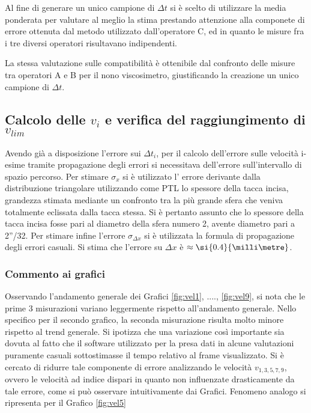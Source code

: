\documentclass[a4paper,11pt,oneside]{article}
\begin{document}
Al fine di generare un unico campione di $\Delta t$ si è scelto di utilizzare la media ponderata per valutare al meglio la stima prestando attenzione alla componete di errore ottenuta dal metodo utilizzato dall'operatore C, ed in quanto le misure fra i tre diversi operatori risultavano indipendenti.\newline

La stessa valutazione sulle compatibilità è ottenibile dal confronto delle misure tra operatori A e B per il nono viscosimetro, giustificando la creazione un unico campione di $\Delta t$.

\subsection{Calcolo delle $v_i$ e verifica del raggiungimento di $v_{lim}$}
Avendo già a disposizione l'errore sui $\Delta t_{i}$, per il calcolo dell'errore sulle velocità i-esime tramite propagazione degli errori si necessitava dell'errore sull'intervallo di spazio percorso. Per stimare $\sigma_x$ si è utilizzato l' errore derivante dalla distribuzione triangolare utilizzando come PTL lo spessore della tacca incisa, grandezza stimata mediante un confronto tra la più grande sfera che veniva totalmente eclissata dalla tacca stessa. Si è pertanto assunto che lo spessore della tacca incisa fosse pari al diametro della sfera numero 2, avente diametro pari a 2''/32. Per stimare infine l'errore $\sigma_{\Delta x}$ si è utilizzata la formula di propagazione degli errori casuali.  Si stima che l'errore su $\Delta x$ è $\approx \si{0.4}{\milli\metre}$.

\subsubsection*{Commento ai grafici}
Osservando l'andamento generale dei Grafici \ref{fig:vel1}, ...., \ref{fig:vel9}, si nota che le prime 3 misurazioni variano leggermente rispetto all'andamento generale. Nello specifico per il secondo grafico, la seconda misurazione risulta molto minore rispetto al trend generale. Si ipotizza che una variazione così importante sia dovuta al fatto che il software utilizzato per la presa dati in alcune valutazioni puramente casuali sottostimasse il tempo relativo al frame visualizzato.
Si è cercato di ridurre tale componente di errore analizzando le velocità $v_{1, 3, 5, 7, 9}$, ovvero le velocità ad indice dispari in quanto non influenzate drasticamente da tale errore, come si può osservare intuitivamente dai Grafici. Fenomeno analogo si ripresenta per il Grafico \ref{fig:vel5}
\end{document}
